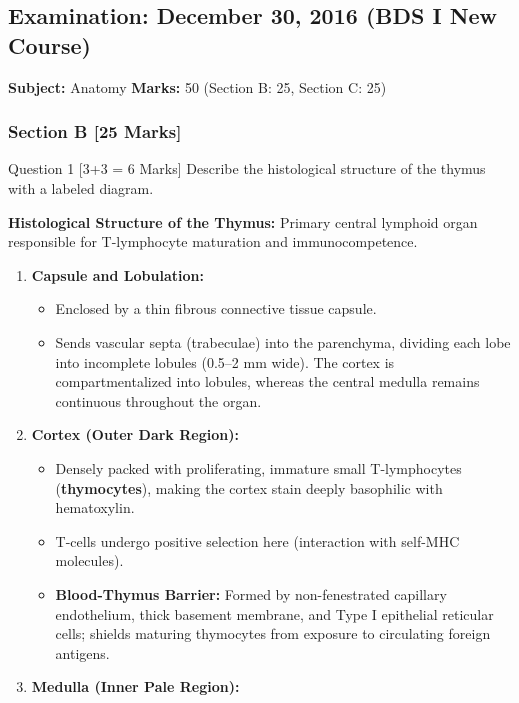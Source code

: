 \documentclass[11pt,a4paper]{article}
\begin{document}
\newpage
\subsection{Examination: December 30, 2016 (BDS I New Course)}
\textbf{Subject:} Anatomy \quad \textbf{Marks:} 50 (Section B: 25, Section C: 25)

\subsubsection{Section B [25 Marks]}

\begin{qbox}{Question 1 [3+3 = 6 Marks]}
Describe the histological structure of the thymus with a labeled diagram.
\end{qbox}

\begin{ansbox}
\textbf{Histological Structure of the Thymus:}
Primary central lymphoid organ responsible for T-lymphocyte maturation and immunocompetence.
\begin{enumerate}[leftmargin=*]
    \item \textbf{Capsule and Lobulation:}
    \begin{itemize}
        \item Enclosed by a thin fibrous connective tissue capsule.
        \item Sends vascular septa (trabeculae) into the parenchyma, dividing each lobe into incomplete lobules (0.5--2 mm wide). The cortex is compartmentalized into lobules, whereas the central medulla remains continuous throughout the organ.
    \end{itemize}
    \item \textbf{Cortex (Outer Dark Region):}
    \begin{itemize}
        \item Densely packed with proliferating, immature small T-lymphocytes (\textbf{thymocytes}), making the cortex stain deeply basophilic with hematoxylin.
        \item T-cells undergo positive selection here (interaction with self-MHC molecules).
        \item \textbf{Blood-Thymus Barrier:} Formed by non-fenestrated capillary endothelium, thick basement membrane, and Type I epithelial reticular cells; shields maturing thymocytes from exposure to circulating foreign antigens.
    \end{itemize}
    \item \textbf{Medulla (Inner Pale Region):}

\end{enumerate}
\end{ansbox}
\end{document}

